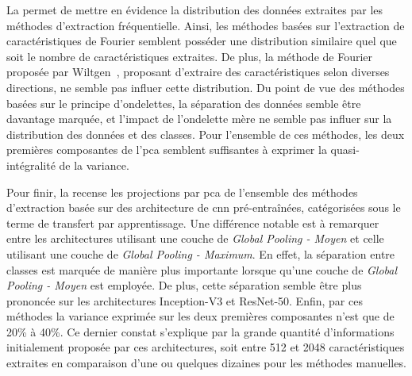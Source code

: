 La  permet de mettre en évidence la distribution des données extraites par les méthodes d'extraction fréquentielle. Ainsi, les méthodes basées sur l'extraction de caractéristiques de Fourier semblent posséder une distribution similaire quel que soit le nombre de caractéristiques extraites. De plus, la méthode de Fourier proposée par Wiltgen~\cite{Wiltgen2008}, proposant d'extraire des caractéristiques selon diverses directions, ne semble pas influer cette distribution. Du point de vue des méthodes basées sur le principe d'ondelettes, la séparation des données semble être davantage marquée, et l'impact de l'ondelette mère ne semble pas influer sur la distribution des données et des classes. Pour l'ensemble de ces méthodes, les deux premières composantes de l'\gls{pca} semblent suffisantes à exprimer la quasi-intégralité de la variance.\par

Pour finir, la  recense les projections par \gls{pca} de l'ensemble des méthodes d'extraction basée sur des architecture de \gls{cnn} pré-entraînées, catégorisées sous le terme de transfert par apprentissage. Une différence notable est à remarquer entre les architectures utilisant une couche de \textit{Global Pooling - Moyen} et celle utilisant une couche de \textit{Global Pooling - Maximum}. En effet, la séparation entre classes est marquée de manière plus importante lorsque qu'une couche de \textit{Global Pooling - Moyen} est employée. De plus, cette séparation semble être plus prononcée sur les architectures Inception-V3 et ResNet-50. Enfin, par ces méthodes la variance exprimée sur les deux premières composantes n'est que de 20\% à 40\%. Ce dernier constat s'explique par la grande quantité d'informations initialement proposée par ces architectures, soit entre 512 et 2048 caractéristiques extraites en comparaison d'une ou quelques dizaines pour les méthodes manuelles.\par

